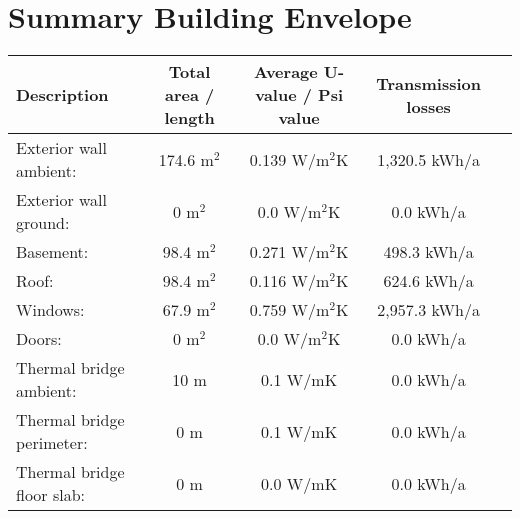 \documentclass{article}
\begin{document}
\section*{Summary Building Envelope}

\begin{table}[h]
    \centering
    \begin{tabular}{@{}lcccc@{}}
        \toprule
        \textbf{Description} & \textbf{Total area / length} & \textbf{Average U-value / Psi value} & \textbf{Transmission losses} \\ \midrule
        Exterior wall ambient:              & 174.6 m$^{2}$                     & 0.139 W/m$^{2}$K                   & 1,320.5 kWh/a        \\
        Exterior wall ground:               & 0 m$^{2}$                         & 0.0 W/m$^{2}$K                     & 0.0 kWh/a           \\
        Basement:                           & 98.4 m$^{2}$                      & 0.271 W/m$^{2}$K                   & 498.3 kWh/a         \\
        Roof:                               & 98.4 m$^{2}$                      & 0.116 W/m$^{2}$K                   & 624.6 kWh/a         \\
        Windows:                            & 67.9 m$^{2}$                      & 0.759 W/m$^{2}$K                   & 2,957.3 kWh/a       \\
        Doors:                              & 0 m$^{2}$                         & 0.0 W/m$^{2}$K                     & 0.0 kWh/a           \\
        Thermal bridge ambient:             & 10 m                               & 0.1 W/mK                           & 0.0 kWh/a           \\
        Thermal bridge perimeter:           & 0 m                                & 0.1 W/mK                           & 0.0 kWh/a           \\
        Thermal bridge floor slab:          & 0 m                                & 0.0 W/mK                           & 0.0 kWh/a           \\
        \bottomrule
    \end{tabular}
\end{table}


\end{document}
